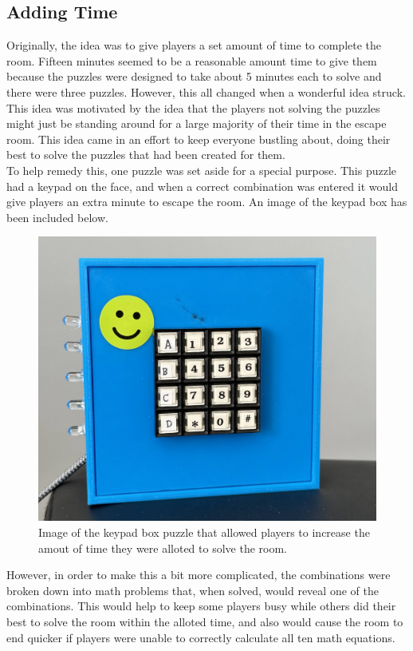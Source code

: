 \documentclass[conference]{IEEEtran}
\begin{document}
\subsection{Adding Time} %

\indent Originally, the idea was to give players a set amount of time to complete the room. Fifteen minutes seemed to be a reasonable amount
time to give them because the puzzles were designed to take about 5 minutes each to solve and there were three puzzles. However,
this all changed when a wonderful idea struck. This idea was motivated by the idea that the players not solving the puzzles might
just be standing around for a large majority of their time in the escape room. This idea came in an effort to keep everyone bustling about, doing
their best to solve the puzzles that had been created for them.
\\
\indent To help remedy this, one puzzle was set aside for a special purpose. This puzzle had a keypad on the face, and when a correct combination was
entered it would give players an extra minute to escape the room. An image of the keypad box has been included below.

\begin{figure}[ht]
    \centering
    \includegraphics[width=0.90\columnwidth]{Images/keypad.jpg}
    \caption{Image of the keypad box puzzle that allowed players to increase the amout of time they were alloted to solve the room.}
    \label{fig:keypad}
\end{figure}

However, in order to make this a bit more complicated, the combinations were broken down
into math problems that, when solved, would reveal one of the combinations. This would help to keep some players busy while others did their best to solve
the room within the alloted time, and also would cause the room to end quicker if players were unable to correctly calculate all ten math equations.
\end{document}
